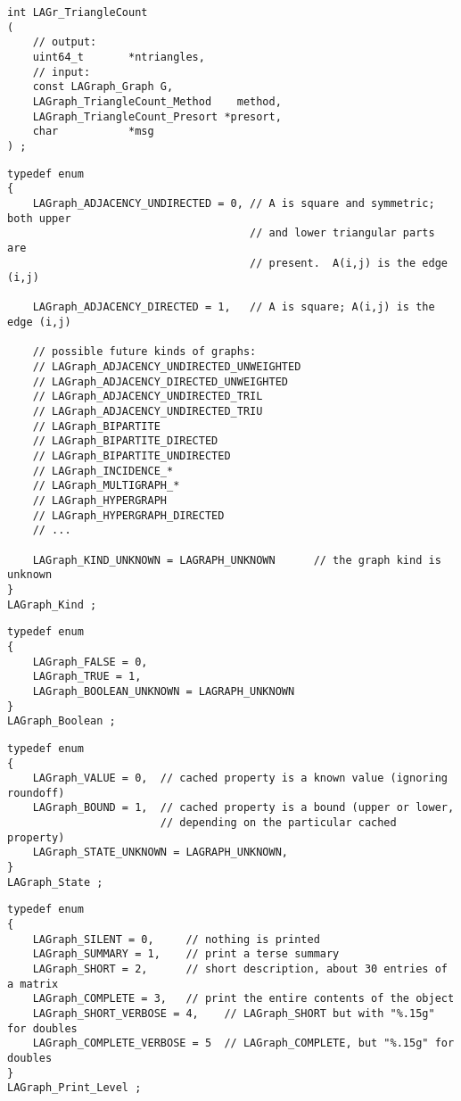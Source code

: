 \begin{verbatim}
int LAGr_TriangleCount
(
    // output:
    uint64_t       *ntriangles,
    // input:
    const LAGraph_Graph G,
    LAGraph_TriangleCount_Method    method,
    LAGraph_TriangleCount_Presort *presort,
    char           *msg
) ;
\end{verbatim}




\begin{verbatim}
typedef enum
{
    LAGraph_ADJACENCY_UNDIRECTED = 0, // A is square and symmetric; both upper
                                      // and lower triangular parts are
                                      // present.  A(i,j) is the edge (i,j)

    LAGraph_ADJACENCY_DIRECTED = 1,   // A is square; A(i,j) is the edge (i,j)

    // possible future kinds of graphs:
    // LAGraph_ADJACENCY_UNDIRECTED_UNWEIGHTED
    // LAGraph_ADJACENCY_DIRECTED_UNWEIGHTED
    // LAGraph_ADJACENCY_UNDIRECTED_TRIL
    // LAGraph_ADJACENCY_UNDIRECTED_TRIU
    // LAGraph_BIPARTITE
    // LAGraph_BIPARTITE_DIRECTED
    // LAGraph_BIPARTITE_UNDIRECTED
    // LAGraph_INCIDENCE_*
    // LAGraph_MULTIGRAPH_*
    // LAGraph_HYPERGRAPH
    // LAGraph_HYPERGRAPH_DIRECTED
    // ...

    LAGraph_KIND_UNKNOWN = LAGRAPH_UNKNOWN      // the graph kind is unknown
}
LAGraph_Kind ;
\end{verbatim}




\begin{verbatim}
typedef enum
{
    LAGraph_FALSE = 0,
    LAGraph_TRUE = 1,
    LAGraph_BOOLEAN_UNKNOWN = LAGRAPH_UNKNOWN
}
LAGraph_Boolean ;
\end{verbatim}




\begin{verbatim}
typedef enum
{
    LAGraph_VALUE = 0,  // cached property is a known value (ignoring roundoff)
    LAGraph_BOUND = 1,  // cached property is a bound (upper or lower,
                        // depending on the particular cached property)
    LAGraph_STATE_UNKNOWN = LAGRAPH_UNKNOWN,
}
LAGraph_State ;
\end{verbatim}




\begin{verbatim}
typedef enum
{
    LAGraph_SILENT = 0,     // nothing is printed
    LAGraph_SUMMARY = 1,    // print a terse summary
    LAGraph_SHORT = 2,      // short description, about 30 entries of a matrix
    LAGraph_COMPLETE = 3,   // print the entire contents of the object
    LAGraph_SHORT_VERBOSE = 4,    // LAGraph_SHORT but with "%.15g" for doubles
    LAGraph_COMPLETE_VERBOSE = 5  // LAGraph_COMPLETE, but "%.15g" for doubles
}
LAGraph_Print_Level ;
\end{verbatim}




